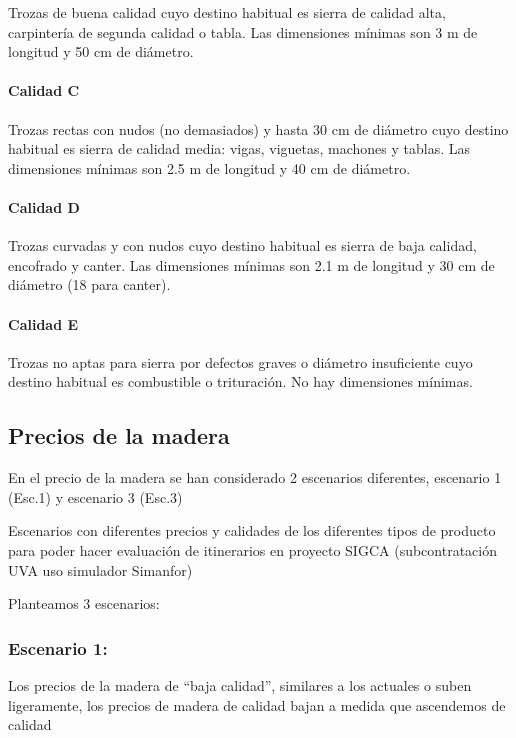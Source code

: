 \documentclass[]{article}
\let\oldparagraph\paragraph
\renewcommand{\paragraph}[1]{\oldparagraph{#1}\mbox{}}
\begin{document}
Trozas de buena calidad cuyo destino habitual es sierra de calidad alta,
carpintería de segunda calidad o tabla. Las dimensiones mínimas son 3 m
de longitud y 50 cm de diámetro.

\paragraph{Calidad C}\label{calidad-c}

Trozas rectas con nudos (no demasiados) y hasta 30 cm de diámetro cuyo
destino habitual es sierra de calidad media: vigas, viguetas, machones y
tablas. Las dimensiones mínimas son 2.5 m de longitud y 40 cm de
diámetro.

\paragraph{Calidad D}\label{calidad-d}

Trozas curvadas y con nudos cuyo destino habitual es sierra de baja
calidad, encofrado y canter. Las dimensiones mínimas son 2.1 m de
longitud y 30 cm de diámetro (18 para canter).

\paragraph{Calidad E}\label{calidad-e}

Trozas no aptas para sierra por defectos graves o diámetro insuficiente
cuyo destino habitual es combustible o trituración. No hay dimensiones
mínimas.

\subsection{Precios de la madera}\label{precios-de-la-madera}

En el precio de la madera se han considerado 2 escenarios diferentes,
escenario 1 (Esc.1) y escenario 3 (Esc.3)

Escenarios con diferentes precios y calidades de los diferentes tipos de
producto para poder hacer evaluación de itinerarios en proyecto SIGCA
(subcontratación UVA uso simulador Simanfor)

Planteamos 3 escenarios:

\subsubsection{Escenario 1:}\label{escenario-1}

Los precios de la madera de ``baja calidad'', similares a los actuales o
suben ligeramente, los precios de madera de calidad bajan a medida que
ascendemos de calidad
\end{document}
